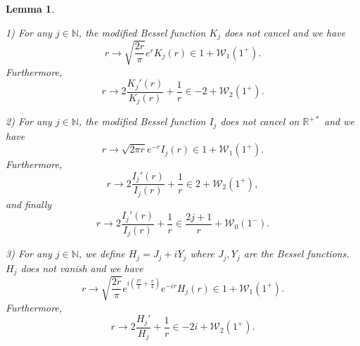 \documentclass[11 pt]{amsart}
\newtheorem{lem}{Lemma}[section]
\theoremstyle{definition}
\theoremstyle{remark}
\numberwithin{equation}{section}
\begin{document}
\begin{lem}
  \label{abudhabi}

  
  1) For any $j \in \mathbb{N}$, the modified Bessel function $K_j$ does not
  cancel and we have
  \[ r \rightarrow \sqrt{\frac{2 r}{\pi}} e^r K_j (r) \in 1 +\mathcal{W}_1
     (1^+) . \]
  Furthermore,
  \[ r \rightarrow 2 \frac{K_j' (r)}{K_j (r)} + \frac{1}{r} \in - 2
     +\mathcal{W}_2 (1^+) . \]
  
  
  2) For any $j \in \mathbb{N}$, the modified Bessel function $I_j$ does not
  cancel on $\mathbb{R}^{+ \ast}$ and we have
  \[ r \rightarrow \sqrt{2 \pi r} e^{- r} I_j (r) \in 1 +\mathcal{W}_1 (1^+) .
  \]
  Furthermore,
  \[ r \rightarrow 2 \frac{I_j' (r)}{I_j (r)} + \frac{1}{r} \in 2
     +\mathcal{W}_2 (1^+), \]
  and finally
  \[ r \rightarrow 2 \frac{I_j' (r)}{I_j (r)} + \frac{1}{r} \in \frac{2 j +
     1}{r} +\mathcal{W}_0 (1^-) . \]
  
  
  3) For any $j \in \mathbb{N}$, we define $H_j = J_j + i Y_j$ where $J_j,
  Y_j$ are the Bessel functions. $H_j$ does not vanish and we have
  \[ r \rightarrow \sqrt{\frac{2 r}{\pi}} e^{i \left( \frac{j \pi}{2} +
     \frac{\pi}{4} \right)} e^{- i r} H_j (r) \in 1 +\mathcal{W}_1 (1^+) . \]
  Furthermore,
  \[ r \rightarrow 2 \frac{H_j'}{H_j} + \frac{1}{r} \in - 2 i +\mathcal{W}_2
     (1^+) . \]
\end{lem}
\end{document}
